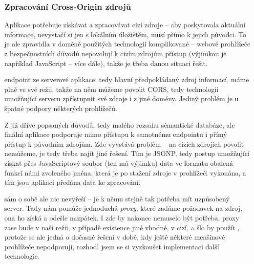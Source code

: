 
\subsubsection{Zpracování Cross-Origin zdrojů}
\label{sec:mobil:cross-origin}
Aplikace potřebuje získávat a zpracovávat cizí zdroje -- aby poskytovala aktuální informace, nevystačí si jen s lokálním úložištěm, musí přímo k jejich původci. To je ale zpravidla v doméně použitých technologií komplikované -- webové prohlížeče z bezpečnostních důvodů nepovolují k cizím zdrojům přístup (výjimkou je například JavaScript -- více dále), takže je třeba danou situaci řešit.

 endpoint ze serverové aplikace, tedy hlavní předpokládaný zdroj informací, máme plně ve své režii, takže na něm můžeme povolit \gls{CORS}, tedy technologii umožňující serveru zpřístupnit své zdroje i z jiné domény. Jediný problém je u špatné podpory některých prohlížečů.

Z již dříve popsaných důvodů, tedy malého rozsahu sémantické databáze, ale finální aplikace podporuje mimo přístupu k samotnému  endpointu i přímý přístup k původním zdrojům. Zde vyvstává problém -- na cizích zdrojích  povolit nemůžeme, je tedy třeba najít jiné řešení. Tím je \gls{JSONP}, tedy postup umožňující získat přes JavaScriptový soubor (ten má výjimku) data ve formátu  obalená funkcí námi zvoleného jména, která je po stažení zdroje v prohlížeči vykonána, a tím jsou aplikaci předána data ke zpracování.

 sám o sobě ale nic nevyřeší -- je k němu stejně tak potřeba mít uzpůsobený server. Tady nám pomůže jednoduchá \textit{proxy}, které zadáme požadavek na zdroj, ona ho získá a odešle nazpátek. I zde by nakonec nemuselo být    potřeba, proxy zase bude v naší režii, v případě existence jiné vhodné, v cizí, a šlo by použít , protože se ale jedná o dočasné řešení v době, kdy ještě některé menšinové prohlížeče  nepodporují, rozhodl jsem se si vyzkoušet implementaci další technologie.

